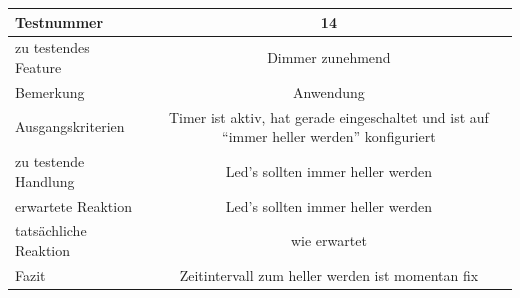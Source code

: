\documentclass[]{article}
\begin{document}
\begin{longtable}[]{@{}lc@{}}
\toprule
\begin{minipage}[b]{0.25\columnwidth}\raggedright\strut
Testnummer\strut
\end{minipage} & \begin{minipage}[b]{0.55\columnwidth}\centering\strut
14\strut
\end{minipage}\tabularnewline
\midrule
\endhead
\begin{minipage}[t]{0.25\columnwidth}\raggedright\strut
zu testendes Feature\strut
\end{minipage} & \begin{minipage}[t]{0.55\columnwidth}\centering\strut
Dimmer zunehmend\strut
\end{minipage}\tabularnewline
\begin{minipage}[t]{0.25\columnwidth}\raggedright\strut
Bemerkung\strut
\end{minipage} & \begin{minipage}[t]{0.55\columnwidth}\centering\strut
Anwendung\strut
\end{minipage}\tabularnewline
\begin{minipage}[t]{0.25\columnwidth}\raggedright\strut
Ausgangskriterien\strut
\end{minipage} & \begin{minipage}[t]{0.55\columnwidth}\centering\strut
Timer ist aktiv, hat gerade eingeschaltet und ist auf ``immer heller
werden'' konfiguriert\strut
\end{minipage}\tabularnewline
\begin{minipage}[t]{0.25\columnwidth}\raggedright\strut
zu testende Handlung\strut
\end{minipage} & \begin{minipage}[t]{0.55\columnwidth}\centering\strut
Led's sollten immer heller werden\strut
\end{minipage}\tabularnewline
\begin{minipage}[t]{0.25\columnwidth}\raggedright\strut
erwartete Reaktion\strut
\end{minipage} & \begin{minipage}[t]{0.55\columnwidth}\centering\strut
Led's sollten immer heller werden\strut
\end{minipage}\tabularnewline
\begin{minipage}[t]{0.25\columnwidth}\raggedright\strut
tatsächliche Reaktion\strut
\end{minipage} & \begin{minipage}[t]{0.55\columnwidth}\centering\strut
wie erwartet\strut
\end{minipage}\tabularnewline
\begin{minipage}[t]{0.25\columnwidth}\raggedright\strut
Fazit\strut
\end{minipage} & \begin{minipage}[t]{0.55\columnwidth}\centering\strut
Zeitintervall zum heller werden ist momentan fix\strut
\end{minipage}\tabularnewline
\bottomrule
\end{longtable}
\end{document}
